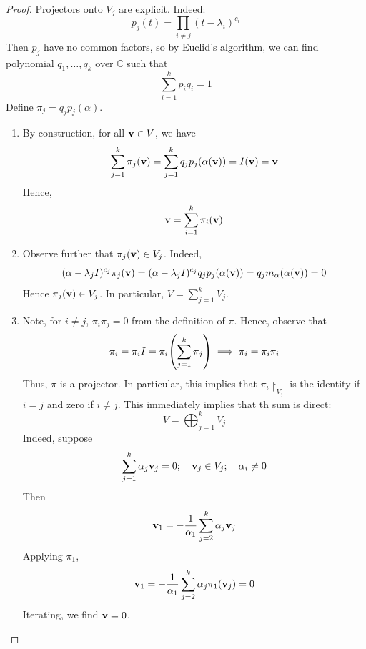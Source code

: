 \documentclass[a4paper]{article}
\begin{document}
\begin{proof}
	Projectors onto $V_j$ are explicit. Indeed: 
	\[
		p_j(t) = \prod_{i\neq j} (t-\lambda_i)^{c_i}
	\]
	Then $p_j$ have no common factors, so by Euclid's algorithm, we can find polynomial $ q_1,\dots,q_k $ over $\mathbb{C}$ such that
	\[
		\sum_{i=1}^{k}p_i q_i = 1
	\]
	Define $ \pi_j = q_j p_j (\alpha) $. 
	\begin{enumerate}
		\item By construction, for all \( {\bf v} \in V \), we have
		\[
			\sum_{j=1}^k \pi_j({\bf v}) = \sum_{j=1}^k q_j p_j(\alpha({\bf v})) = I({\bf v}) = {\bf v}
		\]
		Hence,
		\[
			{\bf v} = \sum_{i=1}^k \pi_i({\bf v})
		\]
		\item Observe further that \( \pi_j({\bf v}) \in V_j \).
		Indeed,
		\[
			(\alpha - \lambda_j I)^{c_j} \pi_j({\bf v}) = (\alpha - \lambda_j I)^{c_j} q_j p_j(\alpha({\bf v})) = q_j m_\alpha (\alpha({\bf v})) = 0
		\]
		Hence \( \pi_j({\bf v}) \in V_j \).
		In particular, \( V = \sum_{j=1}^k V_j \).
		\item Note, for \( i \neq j \), \( \pi_i \pi_j = 0 \) from the definition of \( \pi \).
		Hence, observe that
		\[
			\pi_i = \pi_i I =  \pi_i \qty(\sum_{j=1}^k \pi_j) \implies \pi_i = \pi_i \pi_i
		\]
		Thus, \( \pi \) is a projector.
		In particular, this implies that \( {\pi_i}\restriction_{V_j} \) is the identity if \( i = j \) and zero if \( i \neq j \).
		This immediately implies that th sum is direct:
		\[
			V = \bigoplus_{j=1}^k V_j
		\]
		Indeed, suppose
		\[
			\sum_{j=1}^k \alpha_j {\bf v}_j = 0;\quad {\bf v}_j \in V_j;\quad \alpha_i \neq 0
		\]
		Then
		\[
			{\bf v}_1 = -\frac{1}{\alpha_1} \sum_{j=2}^k \alpha_j {\bf v}_j
		\]
		Applying \( \pi_1 \),
		\[
			{\bf v}_1 = -\frac{1}{\alpha_1} \sum_{j=2}^k \alpha_j \pi_1({\bf v}_j) = 0
		\]
		Iterating, we find \( {\bf v} = 0 \).\qedhere
	\end{enumerate}
\end{proof}
\end{document}
